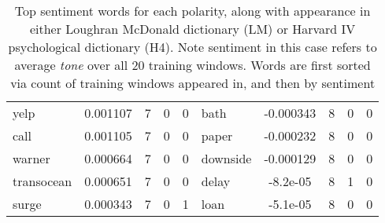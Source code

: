 \documentclass[ oneside,%
                    author={Joshua Felmeden},
                    degree={MEng},
                     title={Sentiment Analysis of Financial Headlines Based on Stock Returns},
                  subtitle={Research}]{dissertation}
\begin{document}
\begin{table}[!ht]
\begin{tabular}{lcccclcccc}
yelp & 0.001107 & 7 & 0 & 0 & bath & -0.000343 & 8 & 0 & 0 \\
call & 0.001105 & 7 & 0 & 0 & paper & -0.000232 & 8 & 0 & 0 \\
warner & 0.000664 & 7 & 0 & 0 & downside & -0.000129 & 8 & 0 & 0 \\
transocean & 0.000651 & 7 & 0 & 0 & delay & -8.2e-05 & 8 & 1 & 0 \\
surge & 0.000343 & 7 & 0 & 1 & loan & -5.1e-05 & 8 & 0 & 0 \\
\bottomrule
\end{tabular}
\caption[Sentiment word list for unigrams]{Top sentiment words for each polarity, along with appearance in either Loughran McDonald dictionary (LM) or Harvard IV psychological dictionary (H4). Note sentiment in this case refers to average \textit{tone} over all 20 training windows. Words are first sorted via count of training windows appeared in, and then by sentiment}
\end{table}
\end{document}
